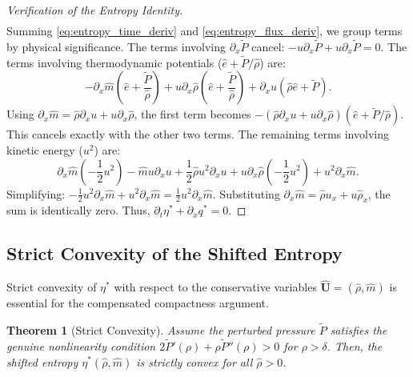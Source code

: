 \documentclass[12pt, reqno]{article}
\newtheorem{theorem}{Theorem}[section]
\theoremstyle{definition}
\newcommand{\pa}{\partial}
\numberwithin{equation}{section}
\begin{document}
\begin{proof}[Verification of the Entropy Identity]
\begin{align}
\end{align}
Summing \eqref{eq:entropy_time_deriv} and \eqref{eq:entropy_flux_deriv}, we group terms by physical significance.
The terms involving $\pa_x \tilde{P}$ cancel: $-u \pa_x \tilde{P} + u \pa_x \tilde{P} = 0$.
The terms involving thermodynamic potentials ($\hat{e} + \tilde{P}/\hat{\rho}$) are:
\[
-\pa_x \hat{m} \left(\hat{e} + \frac{\tilde{P}}{\hat{\rho}}\right) + u \pa_x \hat{\rho} \left(\hat{e} + \frac{\tilde{P}}{\hat{\rho}}\right) + \pa_x u (\hat{\rho}\hat{e} + \tilde{P}).
\]
Using $\pa_x \hat{m} = \hat{\rho}\pa_x u + u\pa_x \hat{\rho}$, the first term becomes $-(\hat{\rho}\pa_x u + u\pa_x \hat{\rho})(\hat{e} + \tilde{P}/\hat{\rho})$. This cancels exactly with the other two terms.
The remaining terms involving kinetic energy ($u^2$) are:
\[
\pa_x \hat{m} \left(-\frac{1}{2}u^2\right) - \hat{m}u \pa_x u + \frac{1}{2}\hat{\rho}u^2 \pa_x u + u \pa_x \hat{\rho} \left(-\frac{1}{2}u^2\right) + u^2 \pa_x \hat{m}.
\]
Simplifying: $-\frac{1}{2}u^2 \pa_x \hat{m} + u^2 \pa_x \hat{m} = \frac{1}{2}u^2 \pa_x \hat{m}$.
Substituting $\pa_x \hat{m} = \hat{\rho}u_x + u\hat{\rho}_x$, the sum is identically zero.
Thus, $\pa_t \eta^* + \pa_x q^* = 0$.
\end{proof}

\subsection{Strict Convexity of the Shifted Entropy}

Strict convexity of $\eta^*$ with respect to the conservative variables $\hat{\mathbf{U}} = (\hat{\rho}, \hat{m})$ is essential for the compensated compactness argument.

\begin{theorem}[Strict Convexity]
\label{thm:entropy_convexity}
Assume the perturbed pressure $\tilde{P}$ satisfies the genuine nonlinearity condition $2\tilde{P}'(\rho) + \rho\tilde{P}''(\rho) > 0$ for $\rho > \delta$. Then, the shifted entropy $\eta^*(\hat{\rho}, \hat{m})$ is strictly convex for all $\hat{\rho} > 0$.
\end{theorem}
\end{document}
